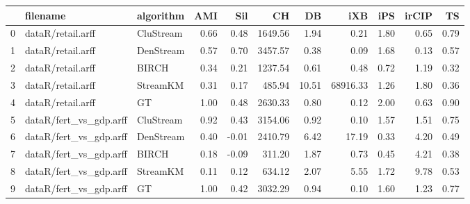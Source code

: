 \begin{tabular}{lllrrrrrrrr}
\toprule
{} &                filename &  algorithm &  AMI &   Sil &      CH &    DB &      iXB &  iPS &  irCIP &   TS \\
\midrule
0 &       dataR/retail.arff &  CluStream & 0.66 &  0.48 & 1649.56 &  1.94 &     0.21 & 1.80 &   0.65 & 0.79 \\
1 &       dataR/retail.arff &  DenStream & 0.57 &  0.70 & 3457.57 &  0.38 &     0.09 & 1.68 &   0.13 & 0.57 \\
2 &       dataR/retail.arff &      BIRCH & 0.34 &  0.21 & 1237.54 &  0.61 &     0.48 & 0.72 &   1.19 & 0.32 \\
3 &       dataR/retail.arff &   StreamKM & 0.31 &  0.17 &  485.94 & 10.51 & 68916.33 & 1.26 &   1.80 & 0.36 \\
4 &       dataR/retail.arff &         GT & 1.00 &  0.48 & 2630.33 &  0.80 &     0.12 & 2.00 &   0.63 & 0.90 \\
5 &  dataR/fert\_vs\_gdp.arff &  CluStream & 0.92 &  0.43 & 3154.06 &  0.92 &     0.10 & 1.57 &   1.51 & 0.75 \\
6 &  dataR/fert\_vs\_gdp.arff &  DenStream & 0.40 & -0.01 & 2410.79 &  6.42 &    17.19 & 0.33 &   4.20 & 0.49 \\
7 &  dataR/fert\_vs\_gdp.arff &      BIRCH & 0.18 & -0.09 &  311.20 &  1.87 &     0.73 & 0.45 &   4.21 & 0.38 \\
8 &  dataR/fert\_vs\_gdp.arff &   StreamKM & 0.11 &  0.12 &  634.12 &  2.07 &     5.55 & 1.72 &   9.78 & 0.53 \\
9 &  dataR/fert\_vs\_gdp.arff &         GT & 1.00 &  0.42 & 3032.29 &  0.94 &     0.10 & 1.60 &   1.23 & 0.77 \\
\bottomrule
\end{tabular}
